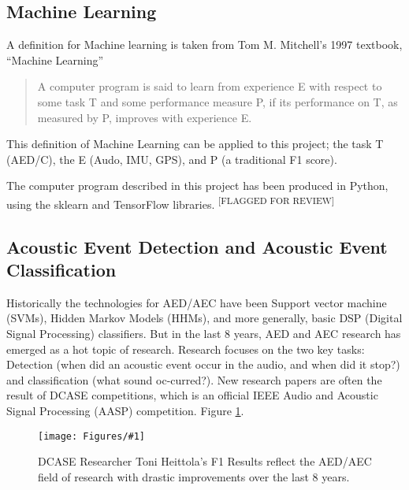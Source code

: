 \documentclass{UoNMCHA}
\newcommand{\flagforreview}{\textsuperscript{\color{red} [FLAGGED FOR REVIEW]}}
\newcommand{\inlineQuote}[1]{``#1''}
\newcommand{\fref}[1] {Figure \ref{#1}}
\newcommand{\fFigure}[3]{
	\begin{figure}[h]
        \begin{center}  
            \texttt{[image: Figures/\#1]}  
            \caption{#2}
            \label{#1}
        \end{center}
	\end{figure}
}
\numberwithin{equation}{section}
\begin{document}
\subsection{Machine Learning}
A definition for Machine learning is taken from Tom M. Mitchell's 1997 textbook, \inlineQuote{Machine Learning}
\begin{quote}
    A computer program is said to learn from experience E with respect to some task T and some performance measure P, if its performance on T, as measured by P, improves with experience E. \cite{Mitchell1997}
\end{quote}

This definition of Machine Learning can be applied to this project; the task T (AED/C), the E (Audo, IMU, GPS), and P (a traditional F1 score). 

The computer program described in this project has been produced in Python, using the sklearn and TensorFlow libraries. \flagforreview

\subsection{Acoustic Event Detection and Acoustic Event Classification}
Historically the technologies for AED/AEC have been Support vector machine (SVMs), Hidden Markov Models (HHMs), and more generally, basic DSP (Digital Signal Processing) classifiers. But in the last 8 years, AED and AEC research has emerged as a hot topic of research. Research focuses on the two key tasks: Detection (when did an acoustic event occur in the audio, and when did it stop?) and classification (what sound oc-curred?). New research papers are often the result of DCASE competitions, which is an official IEEE Audio and Acoustic Signal Processing (AASP) competition. \fref{F1_score.png}.

\fFigure{F1_score.png}{DCASE Researcher Toni Heittola's F1 Results reflect the AED/AEC field of research with drastic improvements over the last 8 years.\cite{ToniWebsite}}{0.8}
\end{document}
